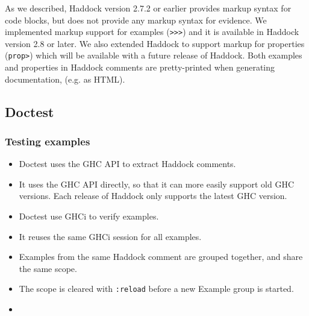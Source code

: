\documentclass[preprint]{sigplanconf}
\begin{document}
As we described, Haddock version 2.7.2 or earlier provides markup syntax for
code blocks, but does not provide any markup syntax for evidence.
We implemented markup support for examples ({\tt >>>}) and it is available in
Haddock version 2.8 or later.
We also extended Haddock to support markup for properties ({\tt prop>}) which
will be available with a future release of Haddock.
Both examples and properties in Haddock comments are pretty-printed when
generating documentation, (e.g. as HTML).




\subsection{Doctest}
\label{sec:doctest}

\subsubsection{Testing examples}

\begin{itemize}
    \item
        Doctest uses the GHC API to extract Haddock comments.
    \item
        It uses the GHC API directly, so that it can more easily
        support old GHC versions.  Each release of Haddock only
        supports the latest GHC version.
    \item
        Doctest use GHCi to verify examples.
    \item
        It reuses the same GHCi session for all examples.
    \item
        Examples from the same Haddock comment are grouped together,
        and share the same scope.
    \item
        The scope is cleared with \verb|:reload| before a new
        Example group is started.
    \item
\end{itemize}
\end{document}
